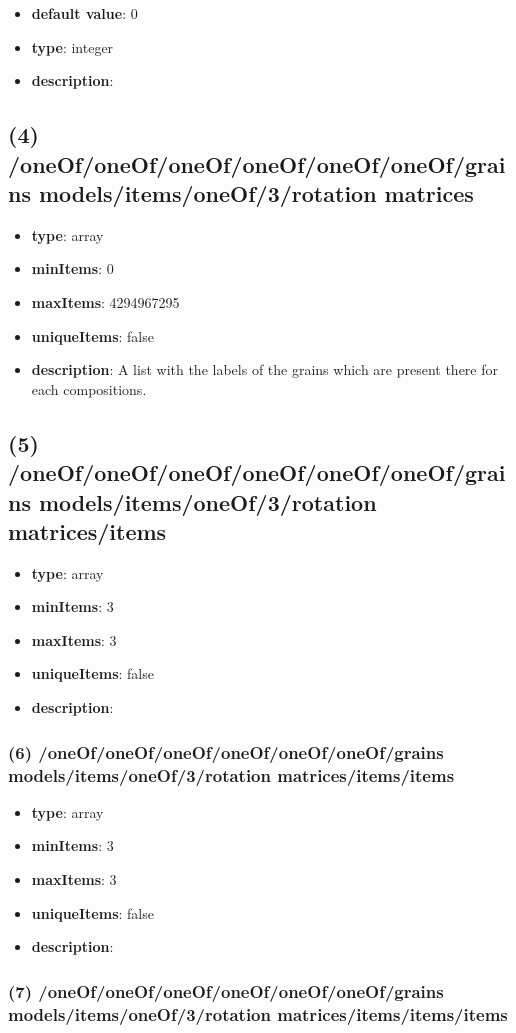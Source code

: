 \begin{itemize}[leftmargin=5em]\item {\bf default value}: 0
\item {\bf type}: integer
\item {\bf description}: 
\end{itemize}\subsection{(4) /oneOf/oneOf/oneOf/oneOf/oneOf/oneOf/grains models/items/oneOf/3/rotation matrices}
\begin{itemize}[leftmargin=4em]\item {\bf type}: array
\item {\bf minItems}: 0
\item {\bf maxItems}: 4294967295
\item {\bf uniqueItems}: false
\item {\bf description}: A list with the labels of the grains which are present there for each compositions.
\end{itemize}\subsection{(5) /oneOf/oneOf/oneOf/oneOf/oneOf/oneOf/grains models/items/oneOf/3/rotation matrices/items}
\begin{itemize}[leftmargin=5em]\item {\bf type}: array
\item {\bf minItems}: 3
\item {\bf maxItems}: 3
\item {\bf uniqueItems}: false
\item {\bf description}: 
\end{itemize}\subsubsection{(6) /oneOf/oneOf/oneOf/oneOf/oneOf/oneOf/grains models/items/oneOf/3/rotation matrices/items/items}
\begin{itemize}[leftmargin=6em]\item {\bf type}: array
\item {\bf minItems}: 3
\item {\bf maxItems}: 3
\item {\bf uniqueItems}: false
\item {\bf description}: 
\end{itemize}\subsubsection{(7) /oneOf/oneOf/oneOf/oneOf/oneOf/oneOf/grains models/items/oneOf/3/rotation matrices/items/items/items}
